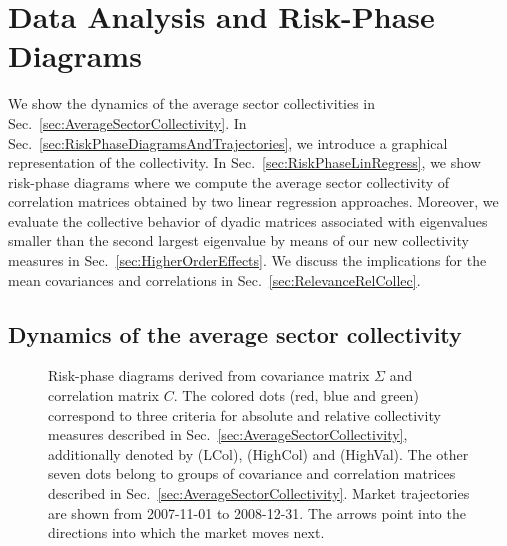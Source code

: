 \documentclass[aps, pra, groupedaddress, showkeys, twocolumn, floatfix, 10pt]{revtex4-2}
\begin{document}
\section{\label{sec:DataAnalysisAndRiskPhaseDiagrams}Data Analysis and Risk-Phase Diagrams}





We show the dynamics of the average sector collectivities in Sec.~\ref{sec:AverageSectorCollectivity}.
In Sec.~\ref{sec:RiskPhaseDiagramsAndTrajectories}, we introduce a graphical representation of the collectivity.
In Sec.~\ref{sec:RiskPhaseLinRegress}, we show risk-phase diagrams where we compute the average sector collectivity of correlation matrices obtained by two linear regression approaches. Moreover, we evaluate the collective behavior of dyadic matrices associated with eigenvalues smaller than the second largest eigenvalue by means of our new collectivity measures in Sec.~\ref{sec:HigherOrderEffects}.
We discuss the implications for the mean covariances and correlations in Sec.~\ref{sec:RelevanceRelCollec}.



\subsection{\label{sec:AverageSectorCollectivity}Dynamics of the average sector collectivity}



%
\begin{figure*}[!htb]
	\centering
	\begin{minipage}{0.5\textwidth}
	\end{minipage}%
	\begin{minipage}{0.5\textwidth}
	\end{minipage}
	\caption{\label{subfig:Main:RiskPhaseMeanPeriod}Risk-phase diagrams derived from \protect{} covariance matrix $\Sigma$ and \protect{} correlation matrix $C$.
		The colored dots (red, blue and green) correspond to three criteria for absolute and relative collectivity measures described in Sec.~\ref{sec:AverageSectorCollectivity}, additionally denoted by (LCol), (HighCol) and (HighVal). 
		The other seven dots belong to groups of covariance and correlation matrices described in Sec.~\ref{sec:AverageSectorCollectivity}.
		Market trajectories are shown from \mbox{2007-11-01} to \mbox{2008-12-31}. The arrows point into the directions into which the market moves next.}
\end{figure*}
\end{document}
